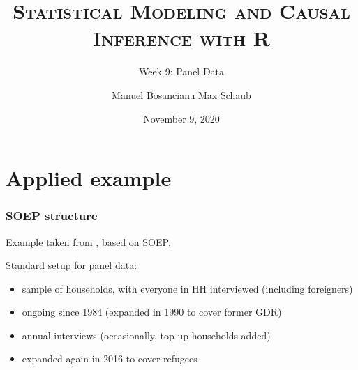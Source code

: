 \documentclass[10pt,english,dvipsnames,aspectratio=169,handout]{beamer}\usepackage[]{graphicx}\usepackage[]{xcolor}
\title{\textsc{Statistical Modeling and Causal Inference with R}}
\subtitle{Week 9: Panel Data}
\date{November 9, 2020}
\author{Manuel Bosancianu \hfill Max Schaub}
\institute{Hertie School of Governance}
\begin{document}
\maketitle





\section{Applied example}

\begin{frame}
  \frametitle{SOEP structure}
  Example taken from , based on SOEP.\bigskip

  Standard setup for panel data:
  
  \begin{itemize}
    \item sample of households, with everyone in HH interviewed (including foreigners)
    \item ongoing since 1984 (expanded in 1990 to cover former GDR)
    \item annual interviews (occasionally, top-up households added)
    \item expanded again in 2016 to cover refugees
  \end{itemize}
  
\end{frame}
\end{document}

